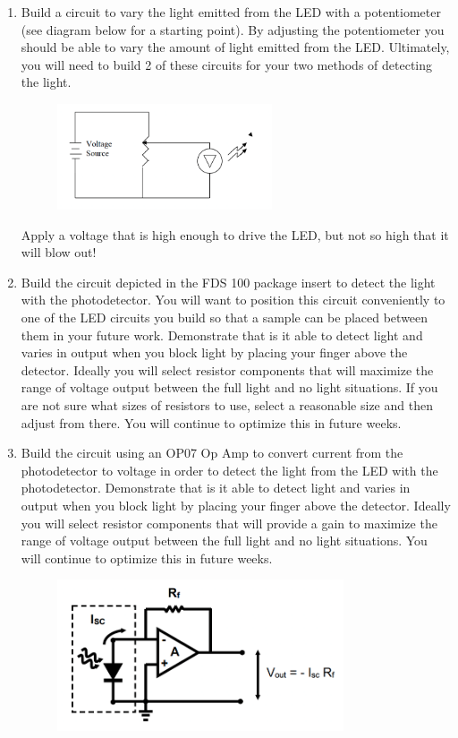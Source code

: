 \documentclass{article}
\begin{document}
\begin{enumerate}
	\item Build a circuit to vary the light emitted from the LED with a potentiometer (see diagram below for a starting point). By adjusting the potentiometer you should be able to vary the amount of light emitted from the LED. Ultimately, you will need to build 2 of these circuits for your two methods of detecting the light.
		\begin{figure}[h]
    	\includegraphics[width=0.6\textwidth]{lab_2_fig_1.png}
    	\centering
		\end{figure}
		
		\begin{warn}
		Apply a voltage that is high enough to drive the LED, but not so high that it will blow out!	
		\end{warn}

	\item Build the circuit depicted in the FDS 100 package insert to detect the light with the photodetector. You will want to position this circuit conveniently to one of the LED circuits you build so that a sample can be placed between them in your future work. Demonstrate that is it able to detect light and varies in output when you block light by placing your finger above the detector. Ideally you will select resistor components that will maximize the range of voltage output between the full light and no light situations. If you are not sure what sizes of resistors to use, select a reasonable size and then adjust from there. You will continue to optimize this in future weeks.
	\item Build the circuit using an OP07 Op Amp to convert current from the photodetector to voltage in order to detect the light from the LED with the photodetector. Demonstrate that is it able to detect light and varies in output when you block light by placing your finger above the detector. Ideally you will select resistor components that will provide a gain to maximize the range of voltage output between the full light and no light situations. You will continue to optimize this in future weeks.
		\begin{figure}[h!]
    	\includegraphics[width=0.8\textwidth]{lab_2_fig_2.png}
    	\centering
		\end{figure}
		

\end{enumerate}
\end{document}
